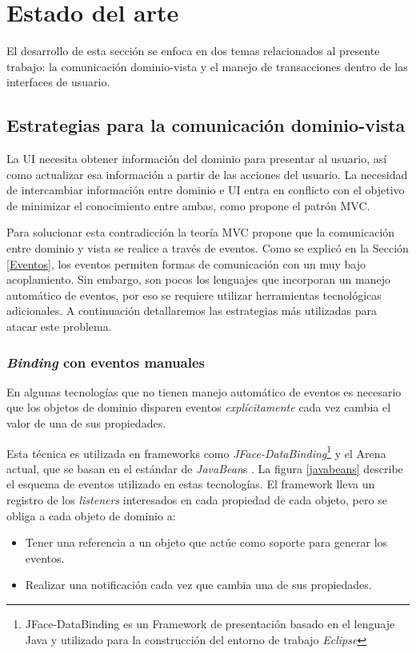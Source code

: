 \section{Estado del arte}
\label{StateOfTheArt}
El desarrollo de esta sección se enfoca en dos temas relacionados al
presente trabajo: la comunicación dominio-vista y el manejo de transacciones
dentro de las interfaces de usuario.

\subsection{Estrategias para la comunicación dominio-vista}
La UI necesita obtener información del dominio para presentar
al usuario, así como actualizar esa información a partir de las acciones del usuario.
La necesidad de intercambiar información entre dominio e UI
entra en conflicto con el objetivo de minimizar el conocimiento entre ambas,
como propone el patrón MVC.

Para solucionar esta contradicción la teoría MVC propone que la
comunicación entre dominio y vista se realice a través de eventos. 
Como se explicó en la Sección \ref{Eventos}, los eventos
permiten formas de comunicación con un muy bajo acoplamiento. 
Sin embargo, son pocos los lenguajes que incorporan un manejo automático de
eventos, por eso se requiere utilizar herramientas tecnológicas adicionales.
A continuación detallaremos las estrategias más utilizadas para atacar este problema.

\subsubsection{\emph{Binding} con eventos manuales}
	En algunas tecnologías que no tienen manejo automático de eventos es necesario que los objetos de dominio disparen eventos 
	\emph{explícitamente} cada vez cambia el valor de una de sus propiedades.
	
	Esta técnica es utilizada en
	frameworks como \emph{JFace-DataBinding}\footnote{JFace-DataBinding es un
	Framework de presentación basado en el lenguaje Java y utilizado para la
	construcción del entorno de trabajo \emph{Eclipse}} y el Arena
	actual, que se basan en el estándar de
	\emph{JavaBean}s \cite{sousa00formal}.
	La figura \ref{javabeans} describe el esquema de eventos utilizado en estas
	tecnologías. El framework lleva un registro de los \emph{listeners}
	interesados en cada propiedad de cada objeto, pero se obliga a cada objeto de dominio a:
	\begin{itemize}
	  \item Tener una referencia a un objeto que actúe como soporte para generar
	  los eventos.
	  \item Realizar una notificación cada vez que cambia una de sus propiedades.
	\end{itemize} 

